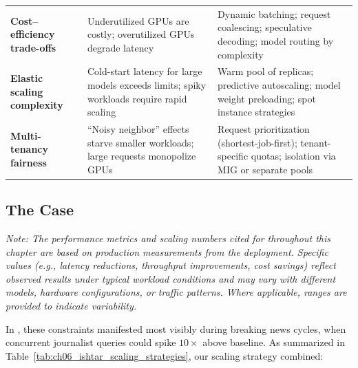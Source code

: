 \begin{table}[t]
\begin{tabularx}{\linewidth}{@{}>{\raggedright\arraybackslash}p{3.5cm}>{\raggedright\arraybackslash}X>{\raggedright\arraybackslash}X@{}}
\textbf{Cost–efficiency trade-offs} & Underutilized GPUs are costly; overutilized GPUs degrade latency & Dynamic batching; request coalescing; speculative decoding; model routing by complexity \\
\addlinespace[2pt]
\textbf{Elastic scaling complexity} & Cold-start latency for large models exceeds limits; spiky workloads require rapid scaling & Warm pool of replicas; predictive autoscaling; model weight preloading; spot instance strategies \\
\addlinespace[2pt]
\textbf{Multi-tenancy fairness} & ``Noisy neighbor'' effects starve smaller workloads; large requests monopolize GPUs & Request prioritization (shortest-job-first); tenant-specific quotas; isolation via MIG or separate pools \\
\bottomrule
\end{tabularx}
\end{table}

\subsection{The \ishtar{} Case}\label{sec:scaling-ishtar-case}
\noindent\textit{Note: The performance metrics and scaling numbers cited for \ishtar{} throughout this chapter are based on production measurements from the deployment. Specific values (e.g., latency reductions, throughput improvements, cost savings) reflect observed results under typical workload conditions and may vary with different models, hardware configurations, or traffic patterns. Where applicable, ranges are provided to indicate variability.}

In \ishtar{}, these constraints manifested most visibly during breaking news cycles, when concurrent journalist queries could spike $10\times$ above baseline. As summarized in Table~\ref{tab:ch06_ishtar_scaling_strategies}, our scaling strategy combined:

